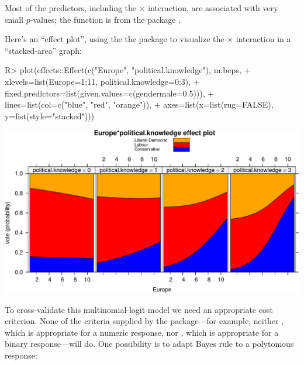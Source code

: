 \documentclass[
]{jss}
\begin{document}
Most of the predictors, including the  \(\times\)
 interaction, are associated with very small
\(p\)-values; the  function is from the  package
\citep{FoxWeisberg:2019}.

Here's an ``effect plot'', using the the  package
\citep{FoxWeisberg:2019} to visualize the  \(\times\)
 interaction in a ``stacked-area'' graph:

\begin{CodeChunk}
\begin{CodeInput}
R> plot(effects::Effect(c("Europe", "political.knowledge"), m.beps,
+             xlevels=list(Europe=1:11, political.knowledge=0:3),
+             fixed.predictors=list(given.values=c(gendermale=0.5))),
+      lines=list(col=c("blue", "red", "orange")),
+      axes=list(x=list(rug=FALSE), y=list(style="stacked")))
\end{CodeInput}


\begin{center}\includegraphics{JSS-article-reduced_files/figure-latex/BEPS-plot-1} \end{center}

\end{CodeChunk}

To cross-validate this multinomial-logit model we need an appropriate
cost criterion. None of the criteria supplied by the 
package---for example, neither , which is appropriate for a
numeric response, nor , which is appropriate for a
binary response---will do. One possibility is to adapt Bayes rule to a
polytomous response:
\end{document}
